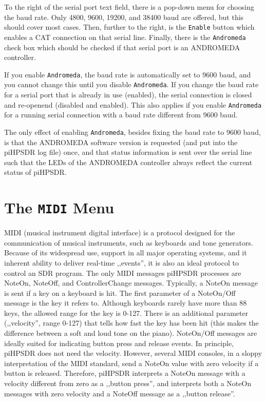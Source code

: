 \documentclass[12pt]{book}
\def\rett#1{\texttt{\color{red}#1}}
\begin{document}
To the right of the serial port text field, there is a pop-down menu for choosing the baud rate. Only 4800,
9600, 19200, and 38400 baud are offered, but this should cover most cases. Then, further to the right, is
the \rett{Enable} button which enables a CAT connection on that serial line. Finally, there is the
\rett{Andromeda} check box which should be checked
if that serial port is an ANDROMEDA controller.

If you enable \rett{Andromeda}, the baud rate is automatically set to 9600 baud, and you cannot
change this until you disable \rett{Andromeda}. If you change the baud rate for a serial
port that is already in use (enabled), the serial connection is closed and re-openend
(disabled and enabled).  This also applies
if you enable \rett{Andromeda} for a running serial connection with a baud rate different
from 9600 baud.

The only effect of enabling \rett{Andromeda}, besides fixing the baud rate to 9600 baud,
is that the ANDROMEDA software version is requested (and put into the piHPSDR log file)
once, and that status information is sent over the serial line such that the LEDs of
the ANDROMEDA controller always reflect the current status of piHPSDR.


\section{The \texttt{MIDI} Menu}
\label{sec:midimenu}
MIDI (musical instrument digital interface) is a protocol designed for the communication of
musical instruments, such as keyboards and tone generators. Because of its widespread use,
support in all major operating systems, and it inherent ability to deliver real-time ,,events'',
it is also an ideal protocol to control an SDR program. The only MIDI messages piHPSDR processes
are NoteOn, NoteOff, and ControllerChange messages. Typically, a NoteOn message is sent if
a key on a keyboard is hit. The first parameter of a NoteOn/Off message is the key
it refers to. Although keyboards rarely have more than 88 keys, the allowed range for
the key is 0-127. There is an additional parameter (,,velocity'', range 0-127) that tells how
fast the key has been hit (this makes the difference between a soft and loud tone on the piano).
NoteOn/Off messages are ideally suited for indicating button press and release events. In principle,
piHPSDR does not need the velocity. However, several MIDI consoles, in a sloppy interpretation of
the MIDI standard, send a NoteOn value with zero velocity if a button is released. Therefore,
piHPSDR interprets a NoteOn message with a velocity different from zero as a ,,button press'',
and interprets both a NoteOn messages with zero velocity and a NoteOff message as a ,,button release''.
\end{document}
